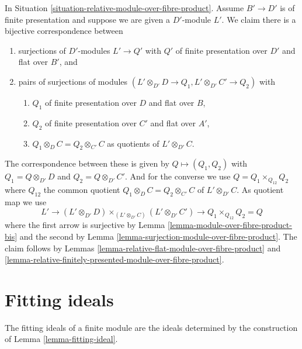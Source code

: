 \begin{remark}
\label{remark-relative-modules-over-fibre-product}
In Situation \ref{situation-relative-module-over-fibre-product}.
Assume $B' \to D'$ is of finite presentation and
suppose we are given a $D'$-module $L'$.
We claim there is a bijective correspondence between
\begin{enumerate}
\item surjections of $D'$-modules $L' \to Q'$ with $Q'$ of finite presentation
over $D'$ and flat over $B'$, and
\item pairs of surjections of modules
$(L' \otimes_{D'} D \to Q_1, L' \otimes_{D'} C' \to Q_2)$
with
\begin{enumerate}
\item $Q_1$ of finite presentation over $D$ and flat over $B$,
\item $Q_2$ of finite presentation over $C'$ and flat over $A'$,
\item $Q_1 \otimes_D C = Q_2 \otimes_{C'} C$ as quotients of
$L' \otimes_{D'} C$.
\end{enumerate}
\end{enumerate}
The correspondence between these is given by $Q \mapsto (Q_1, Q_2)$ with
$Q_1 = Q \otimes_{D'} D$ and $Q_2 = Q \otimes_{D'} C'$. And for the converse
we use $Q = Q_1 \times_{Q_{12}} Q_2$ where $Q_{12}$ the common quotient
$Q_1 \otimes_D C = Q_2 \otimes_{C'} C$ of $L' \otimes_{D'} C$. As quotient
map we use
$$
L' \longrightarrow
(L' \otimes_{D'} D) \times_{(L' \otimes_{D'} C)} (L' \otimes_{D'} C')
\longrightarrow Q_1 \times_{Q_{12}} Q_2 = Q
$$
where the first arrow is surjective by
Lemma \ref{lemma-module-over-fibre-product-bis}
and the second by Lemma \ref{lemma-surjection-module-over-fibre-product}.
The claim follows by
Lemmas \ref{lemma-relative-flat-module-over-fibre-product} and
\ref{lemma-relative-finitely-presented-module-over-fibre-product}.
\end{remark}








\section{Fitting ideals}
\label{section-fitting-ideals}

\noindent
The fitting ideals of a finite module are the ideals determined
by the construction of Lemma \ref{lemma-fitting-ideal}.

